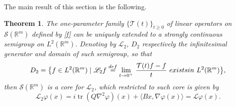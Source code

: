 \documentclass[11pt,a4paper]{amsart}
\def \vf{\varphi}
\newcommand{\Rm}{\mathbb R^m}
\numberwithin{equation}{section}
\newtheorem{theorem}{Theorem}[section]
\numberwithin{equation}{section}
\begin{document}
The main result of this section is the following.

\begin{theorem}\label{T:sgL2}
The one-parameter family $\{\mathcal T(t)\}_{t\ge 0}$ of linear operators on $\mathscr S(\Rm)$ defined by \eqref{f} can be uniquely extended to a strongly continuous semigroup on $L^2(\Rm)$. Denoting by $\mathscr L_2$, $D_2$ respectively the infinitesimal generator and domain of such semigroup, so that 
\[
D_2 = \big\{f\in L^2(\Rm)\mid \mathscr L_2 f \overset{def}{=} \underset{t\to 0^+}{\lim}\ \frac{\mathcal T(t) f - f}{t}\ \emph{exists in }\ L^2(\Rm)\big\},
\]
then $\mathscr S(\Rm)$ is a core for $\mathscr L_2$, which restricted to such core is given by
\[
\mathscr L_2 \vf(x) = i \operatorname{tr}(Q \nabla^2 \vf)(x) +  \langle B x,\nabla \vf(x)\rangle = \mathscr L \vf(x).
\]
\end{theorem}
\end{document}
